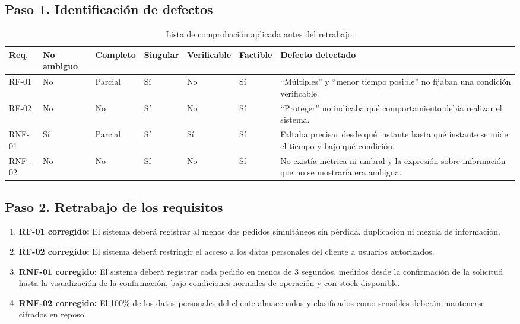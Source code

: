 \documentclass[12pt,a4paper]{article}
\begin{document}
\subsection*{Paso 1. Identificación de defectos}
\begin{table}[H]
\centering
\scriptsize
\begin{tabularx}{\textwidth}{|p{1.5cm}|p{1.5cm}|p{1.4cm}|p{1.4cm}|p{1.5cm}|p{1.3cm}|X|}
\hline
\textbf{Req.} & \textbf{No ambiguo} & \textbf{Completo} & \textbf{Singular} & \textbf{Verificable} & \textbf{Factible} & \textbf{Defecto detectado} \\
\hline
RF-01 & No & Parcial & Sí & No & Sí & ``Múltiples'' y ``menor tiempo posible'' no fijaban una condición verificable. \\
\hline
RF-02 & No & No & Sí & No & Sí & ``Proteger'' no indicaba qué comportamiento debía realizar el sistema. \\
\hline
RNF-01 & Sí & Parcial & Sí & Sí & Sí & Faltaba precisar desde qué instante hasta qué instante se mide el tiempo y bajo qué condición. \\
\hline
RNF-02 & No & No & Sí & No & Sí & No existía métrica ni umbral y la expresión sobre información que no se mostraría era ambigua. \\
\hline
\end{tabularx}
\caption{Lista de comprobación aplicada antes del retrabajo.}
\end{table}

\subsection*{Paso 2. Retrabajo de los requisitos}
\begin{enumerate}[label=\textbf{\arabic*.}]
\item \textbf{RF-01 corregido:} El sistema deberá registrar al menos dos pedidos simultáneos sin pérdida, duplicación ni mezcla de información.
\item \textbf{RF-02 corregido:} El sistema deberá restringir el acceso a los datos personales del cliente a usuarios autorizados.
\item \textbf{RNF-01 corregido:} El sistema deberá registrar cada pedido en menos de 3 segundos, medidos desde la confirmación de la solicitud hasta la visualización de la confirmación, bajo condiciones normales de operación y con stock disponible.
\item \textbf{RNF-02 corregido:} El 100\% de los datos personales del cliente almacenados y clasificados como sensibles deberán mantenerse cifrados en reposo.
\end{enumerate}
\end{document}
